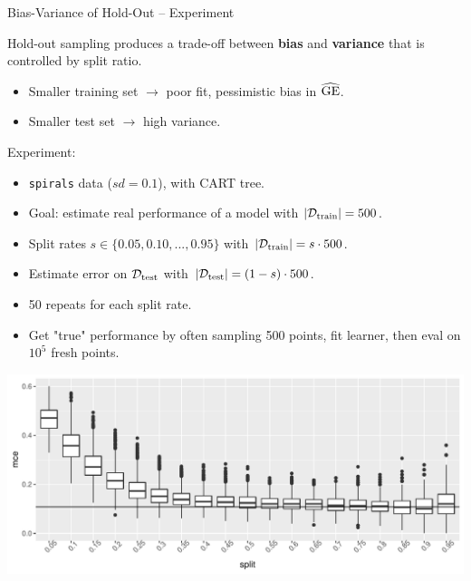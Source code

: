 \documentclass[11pt,compress,t,notes=noshow, xcolor=table]{beamer}
\begin{document}

\begin{vbframe}{Bias-Variance of Hold-Out -- Experiment}

    Hold-out sampling produces a trade-off between \textbf{bias} and
  \textbf{variance} that is controlled by split ratio.
  \begin{itemize}
    \item Smaller training set $\rightarrow$ poor fit, pessimistic bias in $\widehat{\mathrm{GE}}$.
    \item Smaller test set $\rightarrow$ high variance.
  \end{itemize}   

\vfill

Experiment:
\begin{itemize}
  \item \texttt{spirals} data ($sd = 0.1$), with CART tree. 
  \item Goal: estimate real performance of a model with $|\mathcal{D}_{\text{train}}| = 500$.
    \item Split rates $s \in \{0.05, 0.10, ..., 0.95\}$ 
    with $|\mathcal{D}_{\text{train}}| = s \cdot 500$.
    \item Estimate error on $\mathcal{D}_{\text{test}}$ with $|\mathcal{D}_{\text{test}}| = (1 - s) \cdot 500$.
    \item 50 repeats for each split rate.
    \item Get "true" performance by often sampling 500 points, 
      fit learner, then eval on $10^5$ fresh points.
\end{itemize}

\framebreak


\includegraphics[width=\textwidth]{figure/test-holdout-example} 


\end{vbframe}
\end{document}
